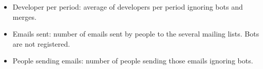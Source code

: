 \documentclass[a4wide,11pt]{article}
\begin{document}
\begin{CJK}{UTF8}{bsmi}
\begin{itemize}
\item Developer per period: average of developers per period ignoring bots and merges.

\item Emails sent: number of emails sent by people to the several mailing lists. Bots are not registered.

\item People sending emails: number of people sending those emails ignoring bots.

\end{itemize}





%

\end{CJK}
\end{document}

